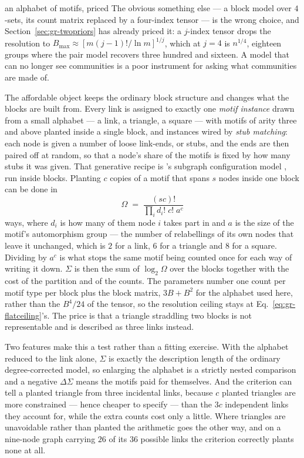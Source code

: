 \begin{calculation}{an alphabet of motifs, priced}
The obvious something else --- a block model over $4$-sets, its count matrix
replaced by a four-index tensor --- is the wrong choice, and
Section~\ref{sec:gr-twopriors} has already priced it: a $j$-index tensor drops the
resolution to $B_{\max}\approx[m(j-1)!/\ln m]^{1/j}$, which at $j=4$ is $n^{1/4}$,
eighteen groups where the pair model recovers three hundred and sixteen. A model
that can no longer see communities is a poor instrument for asking what
communities are made of.

The affordable object keeps the ordinary block structure and changes what the
blocks are built from. Every link is assigned to exactly one \emph{motif
instance} drawn from a small alphabet --- a link, a triangle, a square --- with
motifs of arity three and above planted inside a single block, and instances
wired by \emph{stub matching}: each node is given a number of loose link-ends,
or stubs, and the ends are then paired off at random, so that a node's share of
the motifs is fixed by how many stubs it was given. That generative recipe is
\citeauthor{karrer2010subgraphs}'s subgraph configuration model
\citeyearpar{karrer2010subgraphs}, run inside blocks. Planting $c$
copies of a motif that spans $s$ nodes inside one block can be done in
\begin{equation}
  \Omega \;=\; \frac{(sc)!}{\prod_i d_i!\;c!\;a^{c}}
  \label{eq:gr-omega}
\end{equation}
ways, where $d_i$ is how many of them node $i$ takes part in and $a$ is the size
of the motif's automorphism group --- the number of relabellings of its own nodes
that leave it unchanged, which is $2$ for a link, $6$ for a triangle and $8$ for
a square. Dividing by $a^{c}$ is what stops the same motif being counted once for
each way of writing it down. $\Sigma$ is then the sum of $\log_2\Omega$ over the
blocks together with the cost of the partition and of the counts. The parameters
number one count per motif type per block plus the block matrix, $3B+B^2$ for the
alphabet used here, rather than the $B^4/24$ of the tensor, so the
resolution ceiling stays at Eq.~\eqref{eq:gr-flatceiling}'s. The price is that a triangle straddling
two blocks is not representable and is described as three links instead.
\end{calculation}

Two features make this a test rather than a fitting exercise. With the alphabet
reduced to the link alone, $\Sigma$ is exactly the description length of the
ordinary degree-corrected model, so enlarging the alphabet is a strictly nested
comparison and a negative $\Delta\Sigma$ means the motifs paid for themselves. And
the criterion can tell a planted triangle from three incidental links, because
$c$ planted triangles are more constrained --- hence cheaper to specify --- than
the $3c$ independent links they account for, while the extra counts cost only a
little. Where triangles are unavoidable rather than planted the arithmetic goes
the other way, and on a nine-node graph carrying $26$ of its $36$ possible links
the criterion correctly plants none at all.

